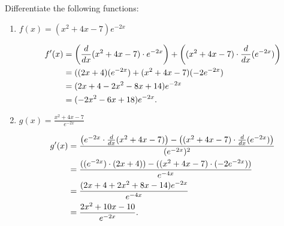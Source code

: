 \documentclass[nooutcomes]{ximera}
\begin{document}
\begin{problem}
Differentiate the following functions:

	\begin{enumerate}
	
	\item  $f(x) = (x^2 + 4x - 7) e^{-2x}$
			\begin{freeResponse}
			\begin{align*}
			f'(x) &= \left( \frac{d}{dx}(x^2 + 4x - 7) \cdot e^{-2x} \right) + \left((x^2 + 4x - 7) \cdot \frac{d}{dx}(e^{-2x}) \right)  \\
			&= ((2x+4)(e^{-2x}) + (x^2 + 4x - 7)(-2e^{-2x})  \\
			&= (2x + 4 - 2x^2 - 8x + 14)e^{-2x}  \\
			&= (-2x^2 - 6x + 18)e^{-2x}.
			\end{align*}
			\end{freeResponse}
			
			
			
	\item  $g(x) = \frac{x^2 + 4x - 7}{e^{-2x}}$
			\begin{freeResponse}
			\begin{align*}
			g'(x) &= \frac{\left( e^{-2x} \cdot \frac{d}{dx}(x^2 + 4x - 7) \right) - \left( (x^2 + 4x - 7) \cdot \frac{d}{dx}(e^{-2x}) \right)}{(e^{-2x})^2}  \\
			&= \frac{((e^{-2x}) \cdot (2x+4)) - ((x^2 + 4x - 7) \cdot (-2e^{-2x}))}{e^{-4x}}  \\
			&= \frac{(2x + 4 + 2x^2 + 8x - 14)e^{-2x}}{e^{-4x}}  \\
			&= \frac{2x^2 + 10x - 10}{e^{-2x}}.
			\end{align*}
			\end{freeResponse}
			
			
			
			
	\end{enumerate}		
\end{problem}
	
	
	
	
			
			
\end{document}
